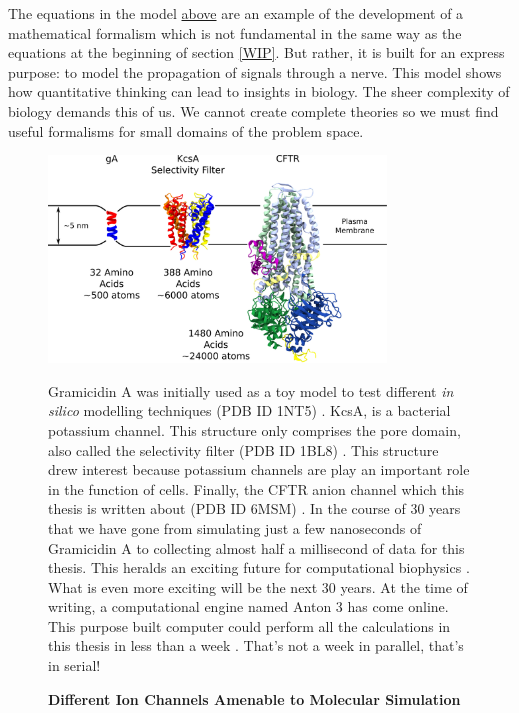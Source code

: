 The equations in the model \href{hh_equations}{above} are an example of the development of a mathematical formalism which is not fundamental in the same way as the equations at the beginning of section \ref{WIP}. But rather, it is built for an express purpose: to model the propagation of signals through a nerve. This model shows how quantitative thinking can lead to insights in biology. The sheer complexity of biology demands this of us. We cannot create complete theories so we must find useful formalisms for small domains of the problem space.

\begin{figure}
	\begin{center}
		\includegraphics[width=0.8\textwidth]{figures/ion_channel_progression.pdf}
	\end{center}
	\captionsetup{singlelinecheck = false, justification=raggedright}
	\caption[Different Ion Channels Amenable to Molecular Simulation] {\textbf{Different Ion Channels Amenable to Molecular Simulation}}{Gramicidin A was initially used as a toy model to test different \textit{in silico} modelling techniques (PDB ID 1NT5) \cite{sham2003}. KcsA, is a bacterial potassium channel. This structure only comprises the pore domain, also called the selectivity filter (PDB ID 1BL8) \cite{doyle1998}. This structure drew interest because potassium channels are play an important role in the function of cells. Finally, the CFTR anion channel which this thesis is written about (PDB ID 6MSM) \cite{zhang2018a}. In the course of 30 years that we have gone from simulating just a few nanoseconds of Gramicidin A to collecting almost half a millisecond of data for this thesis. This heralds an exciting future for computational biophysics \cite{roux1993}. What is even more exciting will be the next 30 years. At the time of writing, a computational engine named Anton 3 has come online. This purpose built computer could perform all the calculations in this thesis in less than a week \cite{jones2022, russell2021}. That's not a week in parallel, that's in serial!}
	\label{ion_channel_progress}
\end{figure}

